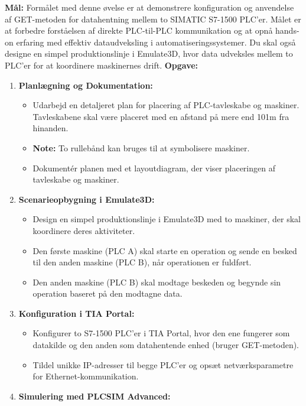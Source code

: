 \textbf{Mål:} Formålet med denne øvelse er at demonstrere konfiguration og anvendelse af GET-metoden for datahentning mellem to SIMATIC S7-1500 PLC'er. Målet er at forbedre forståelsen af direkte PLC-til-PLC kommunikation og at opnå hands-on erfaring med effektiv dataudveksling i automatiseringssystemer. Du skal også designe en simpel produktionslinje i Emulate3D, hvor data udveksles mellem to PLC'er for at koordinere maskinernes drift.
\newline\newline
\noindent\textbf{Opgave:}
\begin{enumerate}
	\item \textbf{Planlægning og Dokumentation:}
	\begin{itemize}
		\item Udarbejd en detaljeret plan for placering af PLC-tavleskabe og maskiner. Tavleskabene skal være placeret med en afstand på mere end 101m fra hinanden.
		\item \textbf{Note:} To rullebånd kan bruges til at symbolisere maskiner.
		\item Dokumentér planen med et layoutdiagram, der viser placeringen af tavleskabe og maskiner.
	\end{itemize}
	\item \textbf{Scenarieopbygning i Emulate3D:}
	\begin{itemize}
		\item Design en simpel produktionslinje i Emulate3D med to maskiner, der skal koordinere deres aktiviteter.
		\item Den første maskine (PLC A) skal starte en operation og sende en besked til den anden maskine (PLC B), når operationen er fuldført.
		\item Den anden maskine (PLC B) skal modtage beskeden og begynde sin operation baseret på den modtagne data.
	\end{itemize}
	\item \textbf{Konfiguration i TIA Portal:}
	\begin{itemize}
		\item Konfigurer to S7-1500 PLC'er i TIA Portal, hvor den ene fungerer som datakilde og den anden som datahentende enhed (bruger GET-metoden).
		\item Tildel unikke IP-adresser til begge PLC'er og opsæt netværksparametre for Ethernet-kommunikation.
	\end{itemize}
	\item \textbf{Simulering med PLCSIM Advanced:}
	\begin{itemize}

\end{itemize}
\end{enumerate}
